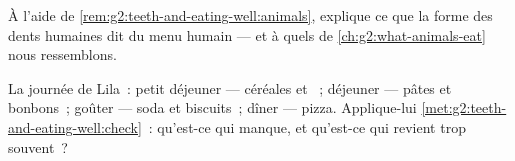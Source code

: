 \begin{exercise}[$\star\star$]\label{exo:g2:teeth-and-eating-well:9}
À l'aide de \cref{rem:g2:teeth-and-eating-well:animals}, explique ce
que la forme des dents humaines dit du menu humain --- et à quels
 de \cref{ch:g2:what-animals-eat} nous ressemblons.
\end{exercise}

\begin{exercise}[$\star\star$]\label{exo:g2:teeth-and-eating-well:10}
La journée de Lila~: petit déjeuner --- céréales et ~; déjeuner
--- pâtes et bonbons~; goûter --- soda et biscuits~; dîner ---
pizza. Applique-lui
\cref{met:g2:teeth-and-eating-well:check}~: qu'est-ce qui manque, et
qu'est-ce qui revient trop souvent~?
\end{exercise}
